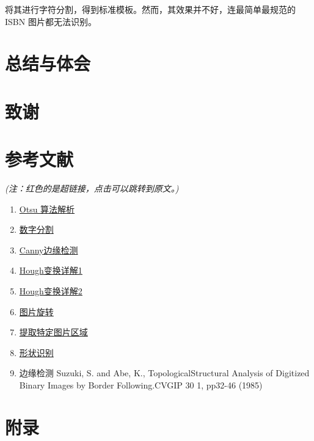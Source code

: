 \documentclass{ctexart}
\begin{document}
将其进行字符分割，得到标准模板。然而，其效果并不好，连最简单最规范的 ISBN 图片都无法识别。


\section{总结与体会}
\section{致谢}
\section{参考文献}


\textit{(注：红色的是超链接，点击可以跳转到原文。)}

\begin{enumerate}
    \item \href{https://blog.csdn.net/a15779627836/article/details/124151125}{Otsu 算法解析}
    \item \href{https://www.cnblogs.com/skyfsm/p/8029668.html}{数字分割}
    \item \href{https://blog.csdn.net/weixin_42272768/article/details/111244896}{Canny边缘检测}
    \item \href{https://blog.csdn.net/qq_30460949/article/details/90293147}{Hough变换详解1}
    \item \href{https://blog.csdn.net/qq_41112170/article/details/125729100}{Hough变换详解2}
    \item \href{https://blog.csdn.net/wyx100/article/details/80541726}{图片旋转}
    \item \href{https://blog.csdn.net/weixin_47365088/article/details/116566822}{提取特定图片区域}
    \item \href{https://blog.csdn.net/LPYchengxuyuan/article/details/122003702?utm_medium=distribute.pc_relevant.none-task-blog-2~default~baidujs_baidulandingword~default-0-122003702-blog-124125975.pc_relevant_aa&spm=1001.2101.3001.4242.1&utm_relevant_index=3}{形状识别}
    \item 边缘检测 Suzuki, S. and Abe, K., TopologicalStructural Analysis of Digitized Binary Images by Border Following.CVGIP 30 1, pp32-46 (1985)
\end{enumerate}

\section{附录}
\end{document}
